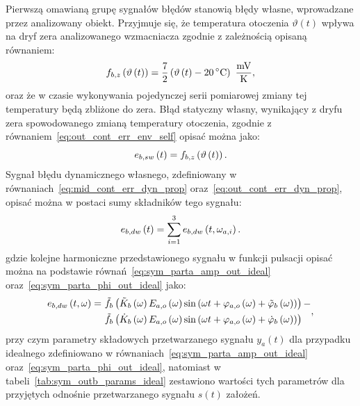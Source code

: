 Pierwszą omawianą grupę sygnałów błędów stanowią błędy własne, wprowadzane przez analizowany obiekt. Przyjmuje się, że temperatura otoczenia $\vartheta(t)$ wpływa na dryf zera analizowanego wzmacniacza zgodnie z zależnością opisaną równaniem:
\begin{equation}
f_{b,z} \left( \vartheta \emb{t} \right) = \frac{7}{2} \left( \vartheta \emb{t} - \qty{20}{\degreeCelsius} \right)~\unit{\frac{mV}{K}} \label{eq:sym_partb_temp_err},
\end{equation}
oraz że w czasie wykonywania pojedynczej serii pomiarowej zmiany tej temperatury będą zbliżone do zera. Błąd statyczny własny, wynikający z dryfu zera spowodowanego zmianą temperatury otoczenia, zgodnie z równaniem~\eqref{eq:out_cont_err_env_self} opisać można jako:
\begin{equation}
e_{b,sw} \left(t\right) = f_{b,z} \left( \vartheta \left(t\right) \right) \label{eq:sym_partb_err_sw}.
\end{equation}
Sygnał błędu dynamicznego własnego, zdefiniowany w równaniach~\eqref{eq:mid_cont_err_dyn_prop} oraz~\eqref{eq:out_cont_err_dyn_prop}, opisać można w postaci sumy składników tego sygnału:
\begin{equation}
e_{b,dw} \left(t\right) = \sum _{i = 1} ^{3} e_{b,dw} \left(t,\omega_{a,i}\right) \label{eq:sym_partb_dyn_self_sum}.
\end{equation}
gdzie kolejne harmoniczne przedstawionego sygnału w funkcji pulsacji opisać można na podstawie równań~\eqref{eq:sym_parta_amp_out_ideal} oraz~\eqref{eq:sym_parta_phi_out_ideal} jako:
\begin{equation}
\begin{split}
e_{b,dw} \left(t,\omega\right) =~
& \tilde{f}_{b} \left( \tilde{K}_{b} \left(\omega\right) E_{a,o} \left(\omega\right) \sin \left( \omega t + \varphi_{a,o} \left(\omega\right) + \tilde{\varphi}_{b} \left(\omega\right) \right) \right)- \\
& \tilde{f}_{b} \left( \dot{K}_{b} \left(\omega\right) E_{a,o} \left(\omega\right) \sin \left( \omega t + \varphi_{a,o} \left(\omega\right) + \dot{\varphi}_{b} \left(\omega\right) \right) \right)
\end{split}
\label{eq:sym_partb_dyn_self_err},
\end{equation}
przy czym parametry składowych przetwarzanego sygnału $y_{a}(t)$ dla przypadku idealnego zdefiniowano w równaniach~\eqref{eq:sym_parta_amp_out_ideal} oraz~\eqref{eq:sym_parta_phi_out_ideal}, natomiast w tabeli~\ref{tab:sym_outb_params_ideal} zestawiono wartości tych parametrów dla przyjętych odnośnie przetwarzanego sygnału $s(t)$ założeń.

